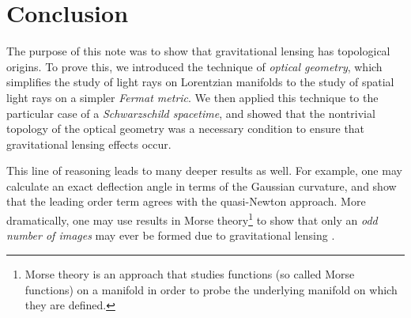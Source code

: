 \section{Conclusion}
The purpose of this note was to show that gravitational lensing has topological origins. To prove this, we introduced the technique of \textit{optical geometry}, which simplifies the study of light rays on Lorentzian manifolds to the study of spatial light rays on a simpler \textit{Fermat metric}. We then applied this technique to the particular case of a \textit{Schwarzschild spacetime}, and showed that the nontrivial topology of the optical geometry was a necessary condition to ensure that gravitational lensing effects occur.

This line of reasoning leads to many deeper results as well. For example, one may calculate an exact deflection angle in terms of the Gaussian curvature, and show that the leading order term agrees with the quasi-Newton approach. More dramatically, one may use results in Morse theory\footnote{Morse theory is an approach that studies functions (so called Morse functions) on a manifold in order to probe the underlying manifold on which they are defined.} to show that only an \textit{odd number of images} may ever be formed due to gravitational lensing \cite{Hasse_2006}.

